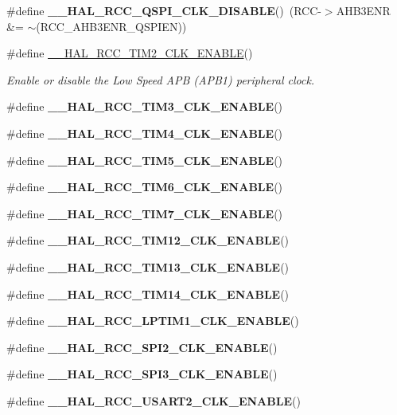 \begin{DoxyCompactItemize}
\#define {\bfseries \+\_\+\+\_\+\+H\+A\+L\+\_\+\+R\+C\+C\+\_\+\+Q\+S\+P\+I\+\_\+\+C\+L\+K\+\_\+\+D\+I\+S\+A\+B\+LE}()~(R\+CC-\/$>$A\+H\+B3\+E\+NR \&= $\sim$(R\+C\+C\+\_\+\+A\+H\+B3\+E\+N\+R\+\_\+\+Q\+S\+P\+I\+EN))
\item 
\#define \mbox{\hyperlink{group___r_c_c_ex___peripheral___clock___enable___disable_ga2e895257faa38376b9cdfcd756909a43}{\+\_\+\+\_\+\+H\+A\+L\+\_\+\+R\+C\+C\+\_\+\+T\+I\+M2\+\_\+\+C\+L\+K\+\_\+\+E\+N\+A\+B\+LE}}()
\begin{DoxyCompactList}\small\item\em Enable or disable the Low Speed A\+PB (A\+P\+B1) peripheral clock. \end{DoxyCompactList}\item 
\#define {\bfseries \+\_\+\+\_\+\+H\+A\+L\+\_\+\+R\+C\+C\+\_\+\+T\+I\+M3\+\_\+\+C\+L\+K\+\_\+\+E\+N\+A\+B\+LE}()
\item 
\#define {\bfseries \+\_\+\+\_\+\+H\+A\+L\+\_\+\+R\+C\+C\+\_\+\+T\+I\+M4\+\_\+\+C\+L\+K\+\_\+\+E\+N\+A\+B\+LE}()
\item 
\#define {\bfseries \+\_\+\+\_\+\+H\+A\+L\+\_\+\+R\+C\+C\+\_\+\+T\+I\+M5\+\_\+\+C\+L\+K\+\_\+\+E\+N\+A\+B\+LE}()
\item 
\#define {\bfseries \+\_\+\+\_\+\+H\+A\+L\+\_\+\+R\+C\+C\+\_\+\+T\+I\+M6\+\_\+\+C\+L\+K\+\_\+\+E\+N\+A\+B\+LE}()
\item 
\#define {\bfseries \+\_\+\+\_\+\+H\+A\+L\+\_\+\+R\+C\+C\+\_\+\+T\+I\+M7\+\_\+\+C\+L\+K\+\_\+\+E\+N\+A\+B\+LE}()
\item 
\#define {\bfseries \+\_\+\+\_\+\+H\+A\+L\+\_\+\+R\+C\+C\+\_\+\+T\+I\+M12\+\_\+\+C\+L\+K\+\_\+\+E\+N\+A\+B\+LE}()
\item 
\#define {\bfseries \+\_\+\+\_\+\+H\+A\+L\+\_\+\+R\+C\+C\+\_\+\+T\+I\+M13\+\_\+\+C\+L\+K\+\_\+\+E\+N\+A\+B\+LE}()
\item 
\#define {\bfseries \+\_\+\+\_\+\+H\+A\+L\+\_\+\+R\+C\+C\+\_\+\+T\+I\+M14\+\_\+\+C\+L\+K\+\_\+\+E\+N\+A\+B\+LE}()
\item 
\#define {\bfseries \+\_\+\+\_\+\+H\+A\+L\+\_\+\+R\+C\+C\+\_\+\+L\+P\+T\+I\+M1\+\_\+\+C\+L\+K\+\_\+\+E\+N\+A\+B\+LE}()
\item 
\#define {\bfseries \+\_\+\+\_\+\+H\+A\+L\+\_\+\+R\+C\+C\+\_\+\+S\+P\+I2\+\_\+\+C\+L\+K\+\_\+\+E\+N\+A\+B\+LE}()
\item 
\#define {\bfseries \+\_\+\+\_\+\+H\+A\+L\+\_\+\+R\+C\+C\+\_\+\+S\+P\+I3\+\_\+\+C\+L\+K\+\_\+\+E\+N\+A\+B\+LE}()
\item 
\#define {\bfseries \+\_\+\+\_\+\+H\+A\+L\+\_\+\+R\+C\+C\+\_\+\+U\+S\+A\+R\+T2\+\_\+\+C\+L\+K\+\_\+\+E\+N\+A\+B\+LE}()

\end{DoxyCompactItemize}
